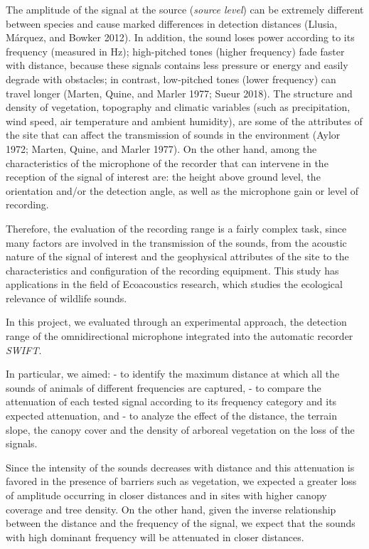\documentclass[fleqn,10pt,lineno]{wlpeerj} %
\begin{document}
The amplitude of the signal at the source (\emph{source level}) can be extremely different between species and cause marked differences in detection distances (Llusia, Márquez, and Bowker 2012). In addition, the sound loses power according to its frequency (measured in Hz); high-pitched tones (higher frequency) fade faster with distance, because these signals contains less pressure or energy and easily degrade with obstacles; in contrast, low-pitched tones (lower frequency) can travel longer (Marten, Quine, and Marler 1977; Sueur 2018). The structure and density of vegetation, topography and climatic variables (such as precipitation, wind speed, air temperature and ambient humidity), are some of the attributes of the site that can affect the transmission of sounds in the environment (Aylor 1972; Marten, Quine, and Marler 1977). On the other hand, among the characteristics of the microphone of the recorder that can intervene in the reception of the signal of interest are: the height above ground level, the orientation and/or the detection angle, as well as the microphone gain or level of recording.

Therefore, the evaluation of the recording range is a fairly complex task, since many factors are involved in the transmission of the sounds, from the acoustic nature of the signal of interest and the geophysical attributes of the site to the characteristics and configuration of the recording equipment. This study has applications in the field of Ecoacoustics research, which studies the ecological relevance of wildlife sounds.

In this project, we evaluated through an experimental approach, the detection range of the omnidirectional microphone integrated into the automatic recorder \emph{SWIFT}.

In particular, we aimed:
- to identify the maximum distance at which all the sounds of animals of different frequencies are captured,
- to compare the attenuation of each tested signal according to its frequency category and its expected attenuation, and
- to analyze the effect of the distance, the terrain slope, the canopy cover and the density of arboreal vegetation on the loss of the signals.

Since the intensity of the sounds decreases with distance and this attenuation is favored in the presence of barriers such as vegetation, we expected a greater loss of amplitude occurring in closer distances and in sites with higher canopy coverage and tree density. On the other hand, given the inverse relationship between the distance and the frequency of the signal, we expect that the sounds with high dominant frequency will be attenuated in closer distances.
\end{document}
